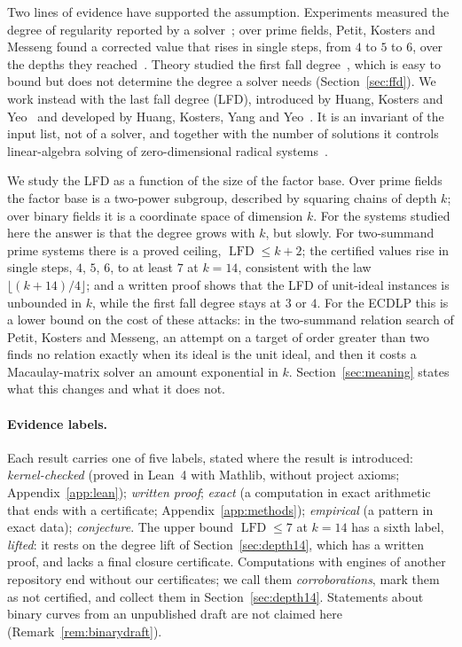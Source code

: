 \documentclass[11pt]{article}
\theoremstyle{definition}\newtheorem{definition}[theorem]{Definition}
\theoremstyle{remark}\newtheorem{remark}[theorem]{Remark}
\newcommand{\lfd}{\operatorname{LFD}}
\begin{document}
Two lines of evidence have supported the assumption. Experiments measured
the degree of regularity reported by a solver~\cite{pkm,gg}; over prime
fields, Petit, Kosters and Messeng found a corrected value that rises in
single steps, from $4$ to $5$ to $6$, over the depths they
reached~\cite[Table~4]{pkm}. Theory studied the first fall
degree~\cite{ky,kw19}, which is easy to bound but does not determine the
degree a solver needs (Section~\ref{sec:ffd}). We work instead with the last
fall degree (LFD), introduced by Huang, Kosters and Yeo~\cite{hky15} and
developed by Huang, Kosters, Yang and Yeo~\cite{hkyy}. It is an invariant of
the input list, not of a solver, and together with the number of solutions
it controls linear-algebra solving of zero-dimensional radical
systems~\cite[Prop.~2.8]{hkyy}.

We study the LFD as a function of the size of the factor base. Over prime
fields the factor base is a two-power subgroup, described by squaring chains
of depth $k$; over binary fields it is a coordinate space of dimension $k$.
For the systems studied here the answer is that the degree grows with $k$,
but slowly. For two-summand prime systems there is a proved ceiling, $\lfd\le k+2$; the
certified values rise in single steps, $4$, $5$, $6$, to at least $7$ at
$k=14$, consistent with the law $\lfloor(k+14)/4\rfloor$; and a written proof shows
that the LFD of unit-ideal instances is unbounded in $k$, while the first
fall degree stays at $3$ or $4$. For the ECDLP this is a lower bound on the
cost of these attacks: in the two-summand relation search of Petit, Kosters
and Messeng, an attempt on a target of order greater than two finds no
relation exactly when its ideal is the unit ideal, and then it costs a
Macaulay-matrix solver an amount exponential in $k$.
Section~\ref{sec:meaning} states what this changes and what it does not.

\paragraph{Evidence labels.} Each result carries one of five labels, stated
where the result is introduced: \emph{kernel-checked} (proved in Lean~4
with Mathlib, without project axioms; Appendix~\ref{app:lean});
\emph{written proof}; \emph{exact} (a computation in exact arithmetic that
ends with a certificate; Appendix~\ref{app:methods}); \emph{empirical} (a
pattern in exact data); \emph{conjecture}. The upper bound $\lfd\le7$ at
$k=14$ has a sixth label, \emph{lifted}: it rests on the degree lift of
Section~\ref{sec:depth14}, which has a written proof, and lacks a final
closure certificate. Computations with engines of another repository end
without our certificates; we call them \emph{corroborations}, mark them as
not certified, and collect them in Section~\ref{sec:depth14}. Statements
about binary curves from an unpublished draft are not claimed here
(Remark~\ref{rem:binarydraft}).
\end{document}
